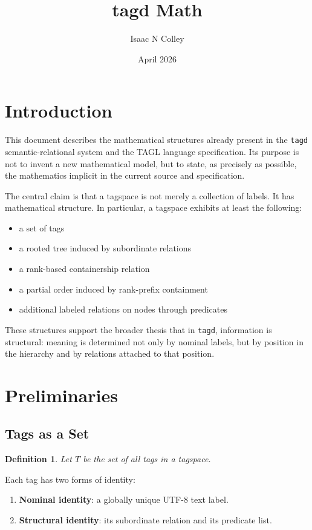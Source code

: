 \documentclass{article}
\title{tagd Math}
\author{Isaac N Colley}
\date{April 2026}
\newtheorem{definition}{Definition}[section]
\begin{document}
\maketitle

\section{Introduction}

This document describes the mathematical structures already present in the
\texttt{tagd} semantic-relational system and the TAGL language specification.
Its purpose is not to invent a new mathematical model, but to state, as
precisely as possible, the mathematics implicit in the current source and
specification.

The central claim is that a tagspace is not merely a collection of labels.
It has mathematical structure. In particular, a tagspace exhibits at least
the following:

\begin{itemize}
    \item a set of tags
    \item a rooted tree induced by subordinate relations
    \item a rank-based containership relation
    \item a partial order induced by rank-prefix containment
    \item additional labeled relations on nodes through predicates
\end{itemize}

These structures support the broader thesis that in \texttt{tagd},
information is structural: meaning is determined not only by nominal labels,
but by position in the hierarchy and by relations attached to that position.

\section{Preliminaries}

\subsection{Tags as a Set}

\begin{definition}
Let $T$ be the set of all tags in a tagspace.
\end{definition}

Each tag has two forms of identity:

\begin{enumerate}[label=\arabic*.]
    \item \textbf{Nominal identity}: a globally unique UTF-8 text label.
    \item \textbf{Structural identity}: its subordinate relation and its
    predicate list.
\end{enumerate}
\end{document}
